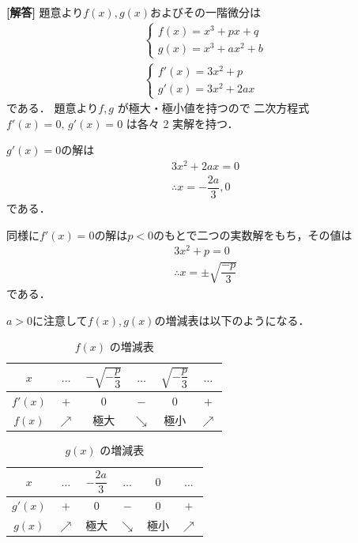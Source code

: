 \documentclass[../../main.tex]{subfiles}
\begin{document}
\begin{oframed}
  
\end{oframed}

{\bf [解答]}
題意より$f(x), g(x)$およびその一階微分は
\begin{align}
  \begin{cases}
    f(x) = x^3+px+q \\
    g(x)=x^3+ax^2+b
  \end{cases} \label{eq:1}\\
  \begin{cases}
    f'(x) = 3x^2 + p \\
    g'(x) = 3x^2 + 2ax
  \end{cases} \label{eq:2}
\end{align}
である．
題意より$f, g$ が極大・極小値を持つので 二次方程式$f'(x) = 0, \, g'(x) = 0$ は各々 2 実解を持つ．

$g'(x)=0$の解は
\begin{align}
  3x^2 + 2ax = 0 \\
  \therefore
  x = -\dfrac{2a}{3}, 0 \label{eq:3}
\end{align}
である．

同様に$f'(x)=0$の解は$p<0$のもとで二つの実数解をもち，その値は
\begin{align}
  3x^2 + p = 0 \\
  \therefore
  x = \pm\sqrt{\dfrac{-p}{3}} \label{eq:4}
\end{align}
である．

$a>0$に注意して$f(x), g(x)$の増減表は以下のようになる．

\begin{table}[htb]
  \centering
  \caption{$f(x)$ の増減表}
  \begin{tabular}{c|ccccc}
    $x$ & $\dots$ & $-\sqrt{-\dfrac{p}{3}}$ & $\dots$ & $\sqrt{-\dfrac{p}{3}}$ & $\dots$ \\ \hline
    $f'(x)$ & $+$ & $0$ & $-$ & $0$ & $+$ \\ \hline
    $f(x)$ & $\nearrow$ & 極大 & $\searrow$ & 極小 & $\nearrow$
  \end{tabular}
\end{table}

\begin{table}[htb]
  \centering
  \caption{$g(x)$ の増減表}
  \begin{tabular}{c|ccccc}
    $x$ & $\dots$ & $-\dfrac{2a}{3}$ & $\dots$ & $0$ & $\dots$ \\ \hline
    $g'(x)$ & $+$ & $0$ & $-$ & $0$ & $+$ \\ \hline
    $g(x)$ & $\nearrow$ & 極大 & $\searrow$ & 極小 & $\nearrow$
  \end{tabular}
\end{table}
\end{document}
